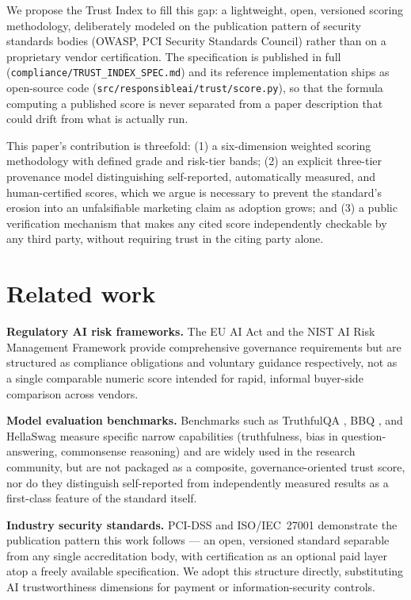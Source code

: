 \documentclass[11pt]{article}
\begin{document}
We propose the Trust Index to fill this gap: a lightweight, open,
versioned scoring methodology, deliberately modeled on the publication
pattern of security standards bodies (OWASP, PCI Security Standards
Council) rather than on a proprietary vendor certification. The
specification is published in full
(\texttt{compliance/TRUST\_INDEX\_SPEC.md}) and its reference
implementation ships as open-source code
(\texttt{src/responsibleai/trust/score.py}), so that the formula
computing a published score is never separated from a paper
description that could drift from what is actually run.

This paper's contribution is threefold: (1) a six-dimension weighted
scoring methodology with defined grade and risk-tier bands; (2) an
explicit three-tier provenance model distinguishing self-reported,
automatically measured, and human-certified scores, which we argue is
necessary to prevent the standard's erosion into an unfalsifiable
marketing claim as adoption grows; and (3) a public verification
mechanism that makes any cited score independently checkable by any
third party, without requiring trust in the citing party alone.

\section{Related work}

\textbf{Regulatory AI risk frameworks.} The EU AI Act \cite{euaiact}
and the NIST AI Risk Management Framework \cite{nistairmf} provide
comprehensive governance requirements but are structured as compliance
obligations and voluntary guidance respectively, not as a single
comparable numeric score intended for rapid, informal buyer-side
comparison across vendors.

\textbf{Model evaluation benchmarks.} Benchmarks such as TruthfulQA
\cite{truthfulqa}, BBQ \cite{bbq}, and HellaSwag \cite{hellaswag}
measure specific narrow capabilities (truthfulness, bias in
question-answering, commonsense reasoning) and are widely used in the
research community, but are not packaged as a composite,
governance-oriented trust score, nor do they distinguish self-reported
from independently measured results as a first-class feature of the
standard itself.

\textbf{Industry security standards.} PCI-DSS \cite{pcidss} and
ISO/IEC~27001 \cite{iso27001} demonstrate the publication pattern this
work follows --- an open, versioned standard separable from any single
accreditation body, with certification as an optional paid layer atop
a freely available specification. We adopt this structure directly,
substituting AI trustworthiness dimensions for payment or
information-security controls.
\end{document}
